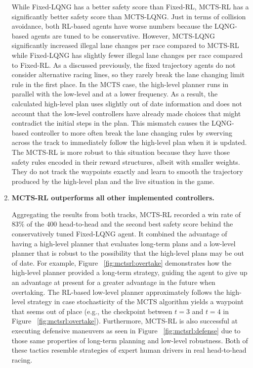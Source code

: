 \begin{enumerate}[wide, labelindent=0pt, font=\bfseries]
While Fixed-LQNG has a better safety score than Fixed-RL, MCTS-RL has a significantly better safety score than MCTS-LQNG. Just in terms of collision avoidance, both RL-based agents have worse numbers because the LQNG-based agents are tuned to be conservative. However, MCTS-LQNG significantly increased illegal lane changes per race compared to MCTS-RL while Fixed-LQNG has slightly fewer illegal lane changes per race compared to Fixed-RL. As a discussed previously, the fixed trajectory agents do not consider alternative racing lines, so they rarely break the lane changing limit rule in the first place. In the MCTS case, the high-level planner runs in parallel with the low-level and at a lower frequency. As a result, the calculated high-level plan uses slightly out of date information and does not account that the low-level controllers have already made choices that might contradict the initial steps in the plan. This mismatch causes the LQNG-based controller to more often break the lane changing rules by swerving across the track to immediately follow the high-level plan when it is updated. The MCTS-RL is more robust to this situation because they have those safety rules encoded in their reward structures, albeit with smaller weights. They do not track the waypoints exactly and learn to smooth the trajectory produced by the high-level plan and the live situation in the game.

\item \textbf{MCTS-RL outperforms all other implemented controllers.}  

 Aggregating the results from both tracks, MCTS-RL recorded a win rate of 83\% of the 400 head-to-head and the second best safety score behind the conservatively tuned Fixed-LQNG agent. It combined the advantage of having a high-level planner that evaluates long-term plans and a low-level planner that is robust to the possibility that the high-level plans may be out of date. For example, Figure~ \ref{fig:mctsrl:overtake} demonstrates how the high-level planner provided a long-term strategy, guiding the agent to give up an advantage at present for a greater advantage in the future when overtaking. The RL-based low-level planner approximately follows the high-level strategy in case stochasticity of the MCTS algorithm yields a waypoint that seems out of place (e.g., the checkpoint between $t=3$ and $t=4$ in Figure~ \ref{fig:mctsrl:overtake}). Furthermore, MCTS-RL is also successful at executing defensive maneuvers as seen in Figure~ \ref{fig:mctsrl:defense} due to those same properties of long-term planning and low-level robustness. Both of these tactics resemble strategies of expert human drivers in real head-to-head racing.
 \end{enumerate}
 
